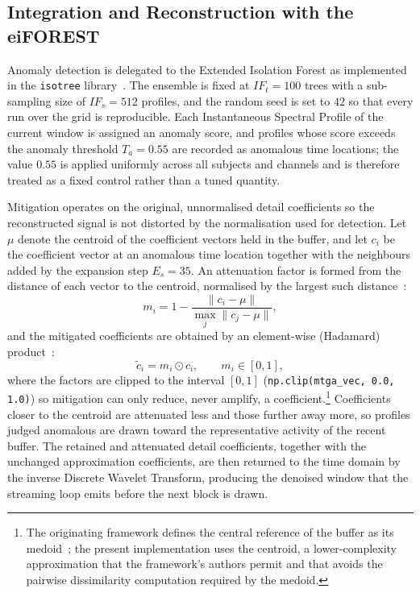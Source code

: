 \documentclass[MScCS,12pt,oneside,final]{uccthesis}
\begin{document}
\subsection{Integration and Reconstruction with the eiFOREST}
\label{subsec:integration_eiforest}
 
Anomaly detection is delegated to the Extended Isolation Forest as implemented in the \texttt{isotree} library~\parencite{cortes2019distance}. The ensemble is fixed at $IF_t = 100$ trees with a sub-sampling size of $IF_s = 512$ profiles, and the random seed is set to $42$ so that every run over the grid is reproducible. Each Instantaneous Spectral Profile of the current window is assigned an anomaly score, and profiles whose score exceeds the anomaly threshold $T_a = 0.55$ are recorded as anomalous time locations; the value $0.55$ is applied uniformly across all subjects and channels and is therefore treated as a fixed control rather than a tuned
quantity.

Mitigation operates on the original, unnormalised detail coefficients so the reconstructed signal is not distorted by the normalisation used for detection. Let $\mu$ denote the centroid of the coefficient vectors held in the buffer, and let $c_i$ be the coefficient vector at an anomalous time location together with the neighbours added by the expansion step $E_s = 35$. An attenuation factor is formed from the distance of each vector to the centroid, normalised by the largest such distance~\parencite{longo2025oneegwavelad}:
\begin{equation}
    m_i = 1 - \frac{\lVert c_i - \mu \rVert}{\max_j \lVert c_j - \mu \rVert},
    \label{eq:mitigator}
\end{equation}
and the mitigated coefficients are obtained by an element-wise (Hadamard) product~\parencite{longo2025oneegwavelad}:
\begin{equation}
    \tilde{c}_i = m_i \odot c_i, \qquad m_i \in [0,1],
    \label{eq:mitigation_apply}
\end{equation}
where the factors are clipped to the interval $[0,1]$ (\texttt{np.clip(mtga\_vec, 0.0, 1.0)}) so mitigation can only reduce, never amplify, a coefficient.\footnote{The originating framework defines the central reference of the buffer as its medoid~\parencite{longo2025oneegwavelad}; the present implementation uses the centroid, a lower-complexity approximation that the framework's authors permit and that avoids the pairwise dissimilarity computation required by the medoid.} Coefficients closer to the centroid are attenuated less and those further away more, so profiles judged anomalous are drawn toward the representative activity of the recent buffer. The retained and attenuated detail coefficients, together with the unchanged approximation coefficients, are then returned to the time domain by the inverse Discrete Wavelet Transform, producing the denoised window that the streaming loop emits before the next block is drawn.
\end{document}
